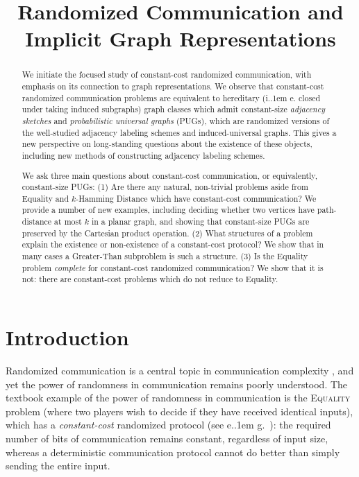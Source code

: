 \documentclass{theoretics}
\title{Randomized Communication and Implicit Graph Representations}
\makeatletter
\newcommand*\ie{i.\kern.1em e.\@\xspace} %
\newcommand*\eg{e.\kern.1em g.\@\xspace} %
\makeatother
\begin{document}
\maketitle

\begin{abstract}
We initiate the focused study of constant-cost randomized communication, with emphasis on its
connection to graph representations. We observe that constant-cost randomized communication
problems are equivalent to hereditary (\ie closed under taking induced subgraphs) graph classes
which admit constant-size \emph{adjacency sketches} and \emph{probabilistic universal graphs}
(PUGs), which are randomized versions of the well-studied adjacency labeling schemes and
induced-universal graphs.  This gives a new perspective on long-standing questions about the
existence of these objects, including new methods of constructing adjacency labeling schemes.

We ask three main questions about constant-cost communication, or equivalently, constant-size
PUGs: (1) Are there any natural, non-trivial problems aside from Equality
and $k$-Hamming Distance which have constant-cost communication? We provide a number of new
examples, including deciding whether two vertices have path-distance at most $k$ in a planar graph,
and showing that constant-size PUGs are preserved by the Cartesian product operation.  (2) What
structures of a problem explain the existence or non-existence of a constant-cost protocol?  
We show that in many cases a Greater-Than subproblem is such a structure.
(3) Is the Equality problem \emph{complete} for constant-cost randomized communication? We
show that it is not: there are constant-cost problems which do not reduce to Equality.
\end{abstract}


\section{Introduction}

Randomized communication is a central topic in communication complexity
\cite{GPW18,CLV19,PSW20,HHH23dimfree}, and yet the power of randomness in communication remains
poorly understood. The textbook example of the power of randomness in communication is the
\textsc{Equality} problem (where two players wish to decide if they have received identical inputs),
which has a \emph{constant-cost} randomized protocol (see \eg~\cite{NK96}): the required number of
bits of communication remains constant, regardless of input size, whereas a deterministic
communication protocol cannot do better than simply sending the entire input.
\end{document}
